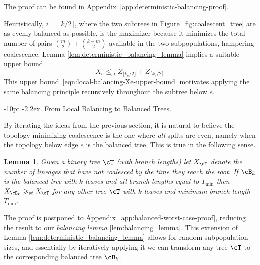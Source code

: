 \documentclass[10pt,oneside,reqno]{article}
\makeatletter
\theoremstyle{plain}
\newtheorem{lemma}[theorem]{Lemma}
\theoremstyle{definition}
\numberwithin{equation}{section}
\def\subsubsection#1{\@startsection{subsubsection}{3}{0pt}%
{\medskipamount}%
{-10pt}%
{\normalsize\itshape}{\kern-2.2ex. #1.}}
\renewcommand{\leq}{\leqslant}
\renewcommand{\geq}{\geqslant}
\makeatother
\begin{document}
\noindent The proof can be found in Appendix~\ref{app:deterministic-balancing-proof}.

Heuristically, $i = \lfloor k/2 \rfloor$, where the two subtrees in Figure~\ref{fig:coalescent_tree} are as evenly 
balanced as possible, is the maximizer because it minimizes the total number of pairs ${m \choose 2} + {k-m \choose 2}$ 
available in the two subpopulations, hampering coalescence. Lemma \ref{lem:deterministic_balancing_lemma} implies a 
suitable upper bound
%
\begin{equation}
    X_e \leq_{st}  Z_{\lfloor k_e/2 \rfloor} + Z_{\lceil k_e/2 \rceil}
    \label{eqn:local-balancing-Xe-upper-bound}
\end{equation}
%
 This upper bound~\eqref{eqn:local-balancing-Xe-upper-bound} motivates applying the same balancing principle recursively throughout the subtree below $e$.


\subsubsection{From Local Balancing to Balanced Trees}
\label{sec:recursive-balancing}

By iterating the ideas from the previous section, it is natural to believe the topology
minimizing coalescence is the one where \textit{all} splits are even, namely when the 
topology below edge $e$ is the balanced tree. This is true in the following sense.

\begin{lemma}
     Given a binary tree $\cT$ (with branch lengths) let $X_\cT$ denote the number of lineages that have not coalesced by the time they reach the root. If $\cB_k$ is the balanced tree with $k$ leaves and all branch lengths equal to $T_{\mathrm{min}}$ then $X_{\cB_k} \geq_{st} X_\cT$ for any other tree $\cT$ with $k$ leaves and minimum branch length $T_{\mathrm{min}}$. 
    \label{lem:balanced_is_worse_case}
\end{lemma}
%
\noindent The proof is postponed to Appendix~\ref{app:balanced-worst-case-proof}, reducing 
the result to our \textit{balancing lemma} \ref{lem:balancing_lemma}. This extension of
Lemma \ref{lem:deterministic_balancing_lemma} allows for random 
subpopulation sizes, and essentially by iteratively applying it we can transform any tree
$\cT$ to the corresponding balanced tree $\cB_k$.
\end{document}
